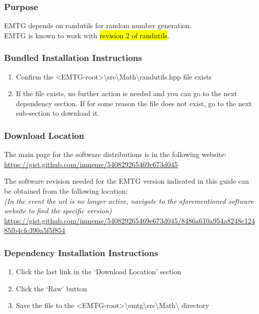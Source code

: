 
\subsubsection{Purpose}
\ac{EMTG} depends on randutils for random number generation. \\ \ac{EMTG} is known to work with \hl{revision 2 of randutils}.

\subsubsection{Bundled Installation Instructions}

\begin{enumerate}
	\item Confirm the \textless EMTG-root\textgreater \textbackslash src\textbackslash Math\textbackslash randutils.hpp \hspace{1pt} file exists
	\item If the file exists, no further action is needed and you can go to the next dependency section. If for some reason the file does not exist, go to the next sub-section to download it.
\end{enumerate}

\subsubsection{Download Location}
\noindent The main page for the software distributions is in the following website: \\
\url{https://gist.github.com/imneme/540829265469e673d045}

\noindent The software revision needed for the EMTG version indicated in this guide can be obtained from the following location: \\
\emph{(In the event the url is no longer active, navigate to the aforementioned software website to find the specific version)} \\
\url{https://gist.github.com/imneme/540829265469e673d045/8486a610a954a8248c12485fb4cfc390a5f5f854}

\subsubsection{Dependency Installation Instructions}
\begin{enumerate}
	\item Click the last link in the ‘Download Location’ section
	\item Click the ‘Raw’ button
	\item Save the file to the \textless EMTG-root\textgreater \textbackslash emtg\textbackslash src\textbackslash Math\textbackslash \hspace{1pt} directory
\end{enumerate}
